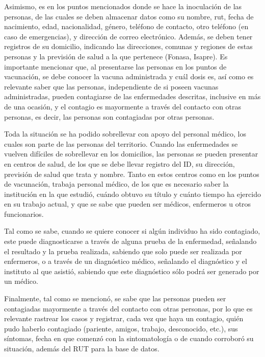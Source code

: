 \documentclass[letterpaper]{article}
\begin{document}
Asimismo, es en los puntos mencionados donde se hace la inoculación de las personas, de las cuales se deben almacenar datos como su nombre, rut, fecha de nacimiento, edad, nacionalidad, género, teléfono de contacto, otro teléfono (en caso de emergencias), y dirección de correo electrónico. Además, se deben tener registros de su domicilio, indicando las direcciones, comunas y regiones de estas personas y la previsión de salud a la que pertenece (Fonasa, Isapre). Es importante mencionar que, al presentarse las personas en los puntos de vacunación, se debe conocer la vacuna administrada y cuál dosis es, así como es relevante saber que las personas, independiente de si poseen vacunas administradas, pueden contagiarse de las enfermedades descritas, inclusive en más de una ocasión, y el contagio es mayormente a través del contacto con otras personas, es decir, las personas son contagiadas por otras personas. 

Toda la situación se ha podido sobrellevar con apoyo del personal médico, los cuales son parte de las personas del territorio. Cuando las enfermedades se vuelven difíciles de sobrellevar en los domicilios, las personas se pueden presentar en centros de salud, de los que se debe llevar registro del ID, su dirección, previsión de salud que trata y nombre. Tanto en estos centros como en los puntos de vacunación, trabaja personal médico, de los que es necesario saber la institución en la que estudió, cuándo obtuvo su título y cuánto tiempo ha ejercido en su trabajo actual, y que se sabe que pueden ser médicos, enfermeros u otros funcionarios.

Tal como se sabe, cuando se quiere conocer si algún individuo ha sido contagiado, este puede diagnosticarse a través de alguna prueba de la enfermedad, señalando el resultado y la prueba realizada, sabiendo que solo puede ser realizada por enfermeros, o a través de un diagnóstico médico, señalando el diagnóstico y el instituto al que asistió, sabiendo que este diagnóstico sólo podrá ser generado por un médico. 

Finalmente, tal como se mencionó, se sabe que las personas pueden ser contagiadas mayormente a través del contacto con otras personas, por lo que es relevante rastrear los casos y registrar, cada vez que haya un contagio, quién pudo haberlo contagiado (pariente, amigos, trabajo, desconocido, etc.), sus síntomas, fecha en que comenzó con la sintomatología o de cuando corroboró su situación, además del RUT para la base de datos. 
\end{document}

